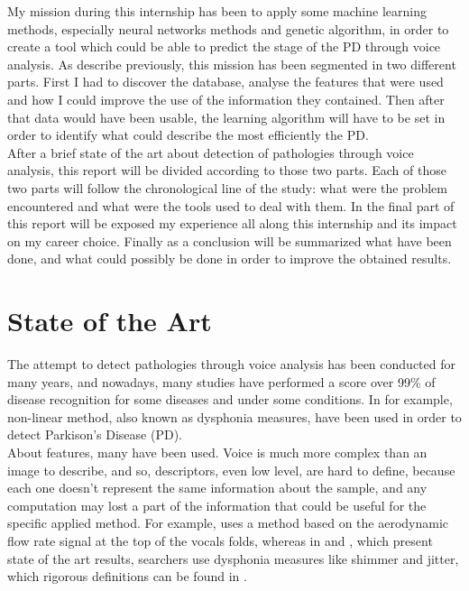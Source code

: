 \documentclass{report}
\begin{document}
	My mission during this internship has been to apply some machine learning methods, especially neural networks methods and genetic algorithm, in order to create a tool which could be able to predict the stage of the PD through voice analysis. As describe previously, this mission has been segmented in two different parts. First I had to discover the database, analyse the features that were used and how I could improve the use of the information they contained. Then after that data would have been usable, the learning algorithm will have to be set in order to identify what could describe the most efficiently the PD.\\
	
	After a brief state of the art about detection of pathologies through voice analysis, this report will be divided according to those two parts. Each of those two parts will follow the chronological line of the study: what were the problem encountered and what were the tools used to deal with them. In the final part of this report will be exposed my experience all along this internship and its impact on my career choice. Finally as a conclusion will be summarized what have been done, and what could possibly be done in order to improve the obtained results.\\
	
	\chapter{State of the Art}
	
	The attempt to detect pathologies through voice analysis has been conducted for many years, and nowadays, many studies have performed a score over 99\% of disease recognition for some diseases and under some conditions. In \cite{little2006nonlinear} for example, non-linear method, also known as dysphonia measures, have been used in order to detect Parkison's Disease (PD).\\
	
	About features, many have been used. Voice is much more complex than an image to describe, and so, descriptors, even low level, are hard to define, because each one doesn't represent the same information about the sample, and any computation may lost a part of the information that could be useful for the specific applied method. For example, \cite{little2006nonlinear} uses a method based on the aerodynamic flow rate signal at the top of the vocals folds, whereas in \cite{tsanas2012novel} and \cite{tsanas2012using}, which present state of the art results, searchers use dysphonia measures like shimmer and jitter, which rigorous definitions can be found in \cite{tsanas2011nonlinear}.\\
	
\end{document}
